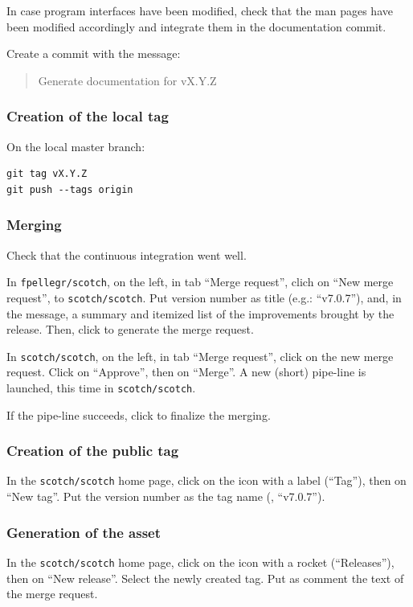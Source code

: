 \noi
In case program interfaces have been modified, check that the man
pages have been modified accordingly and integrate them in the
documentation commit.

Create a commit with the message:
\begin{quote}
Generate documentation for vX.Y.Z
\end{quote}

\subsubsection{Creation of the local tag}

On the local master branch:
\begin{lstlisting}
git tag vX.Y.Z
git push --tags origin
\end{lstlisting}

\subsubsection{Merging}

Check that the continuous integration went well.

\noi
In \texttt{fpellegr/scotch}, on the left, in tab ``Merge request'',
clich on ``New merge request'', to \texttt{scotch/scotch}. Put version
number as title (e.g.: ``v7.0.7''), and, in the message, a summary and
itemized list of the improvements brought by the release. Then, click
to generate the merge request.

\noi
In \texttt{scotch/scotch}, on the left, in tab ``Merge request'',
click on the new merge request. Click on ``Approve'', then on
``Merge''. A new (short) pipe-line is launched, this time in
\texttt{scotch/scotch}.

\noi
If the pipe-line succeeds, click to finalize the merging.

\subsubsection{Creation of the public tag}

In the \texttt{scotch/scotch} home page, click on the icon with a
label (``Tag''), then on ``New tag''. Put the version number as the
tag name (\eg, ``v7.0.7'').

\subsubsection{Generation of the asset}

In the \texttt{scotch/scotch} home page, click on the icon with a
rocket (``Releases''), then on ``New release''. Select the newly
created tag. Put as comment the text of the merge request.
